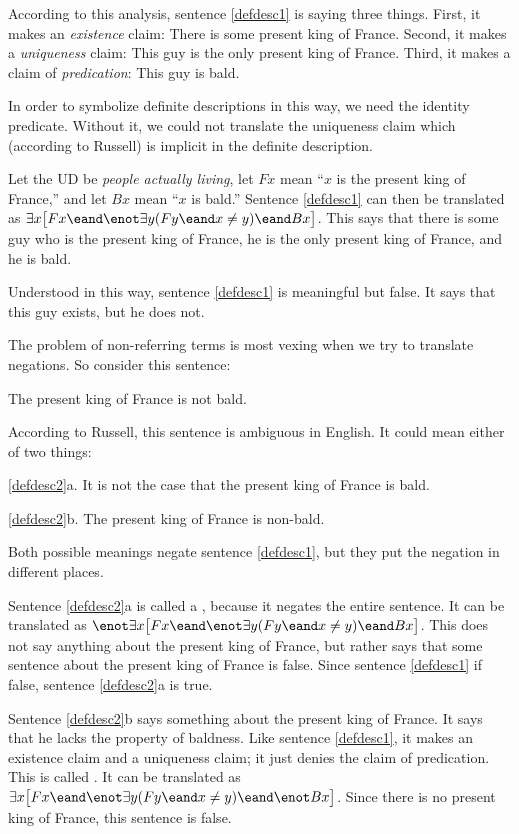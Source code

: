 According to this analysis, sentence \ref{defdesc1} is saying three things. First, it makes an \emph{existence} claim: There is some present king of France. Second, it makes a \emph{uniqueness} claim: This guy is the only present king of France. Third, it makes a claim of \emph{predication}: This guy is bald.

In order to symbolize definite descriptions in this way, we need the identity predicate. Without it, we could not translate the uniqueness claim which (according to Russell) is implicit in the definite description.

Let the UD be \emph{people actually living}, let $Fx$ mean ``$x$ is the present king of France,'' and let $Bx$ mean ``$x$ is bald.'' Sentence \ref{defdesc1} can then be translated as $\exists x\bigl[Fx \eand \enot\exists y(Fy \eand x\neq y) \eand Bx\bigr]$. This says that there is some guy who is the present king of France, he is the only present king of France, and he is bald.

Understood in this way, sentence \ref{defdesc1} is meaningful but false. It says that this guy exists, but he does not.

The problem of non-referring terms is most vexing when we try to translate negations. So consider this sentence:
\begin{kormanize}
\item[\ex{defdesc2}] The present king of France is not bald.
\end{kormanize}
According to Russell, this sentence is ambiguous in English. It could mean either of two things:
\begin{kormanize}
\item[\ref{defdesc2}a.] It is not the case that the present king of France is bald.
\item[\ref{defdesc2}b.] The present king of France is non-bald.
\end{kormanize}
Both possible meanings negate sentence \ref{defdesc1}, but they put the negation in different places.

Sentence \ref{defdesc2}a is called a , because it negates the entire sentence. It can be translated as $\enot\exists x\bigl[Fx \eand \enot\exists y(Fy \eand x\neq y) \eand Bx\bigr]$. This does not say anything about the present king of France, but rather says that some sentence about the present king of France is false. Since sentence \ref{defdesc1} if false, sentence \ref{defdesc2}a is true.

Sentence \ref{defdesc2}b says something about the present king of France. It says that he lacks the property of baldness. Like sentence \ref{defdesc1}, it makes an existence claim and a uniqueness claim; it just denies the claim of predication. This is called . It can be translated as $\exists x\bigl[Fx \eand \enot\exists y(Fy \eand x\neq y) \eand \enot Bx\bigr]$. Since there is no present king of France, this sentence is false.

